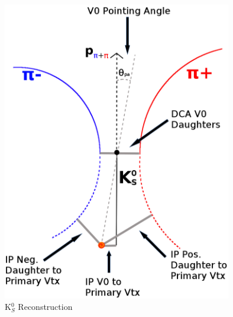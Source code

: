 \begin{figure}[h]
  \centering
  \includegraphics[width=100mm]{3_DataSelection/Figures/K0Cuts.pdf}
  \caption[K$^{0}_{S}$ Reconstruction]{K$^{0}_{S}$ Reconstruction}
  \label{fig:K0Reconstruction}
\end{figure}


